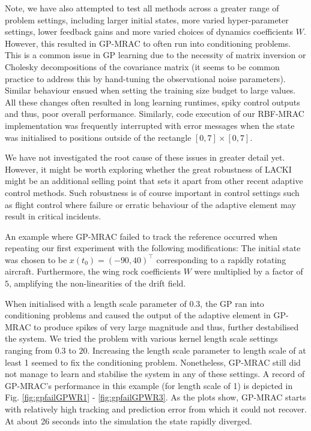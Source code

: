\documentclass{article} %
\theoremstyle{definition}
\theoremstyle{remark}
\begin{document}
Note, we have also attempted to test all methods across a greater range of problem settings, including larger initial states, more varied hyper-parameter settings, lower feedback gains and more varied choices of dynamics coefficients $W$. However, this resulted in GP-MRAC to often run into conditioning problems. This is a common issue in GP learning due to the necessity of matrix inversion or Cholesky decompositions of the covariance matrix (it seems to be common practice to address this by hand-tuning the observational noise parameters). Similar behaviour ensued when setting the training size budget to large values. All these changes often resulted in long learning runtimes, spiky control outputs and thus, poor overall performance. Similarly, code execution of our RBF-MRAC implementation was frequently interrupted with error messages when the state was initialised to positions outside of the rectangle $[0,7] \times [0,7]$.

We have not investigated the root cause of these issues in greater detail yet. However, it might be worth exploring whether the great robustness of LACKI might be an additional selling point that sets it apart from other recent adaptive control methods. Such robustness is of course important in control settings such as flight control where failure or erratic behaviour of the adaptive element may result in critical incidents. 

An example where GP-MRAC failed to track the reference occurred when repeating our first experiment  with the following modifications: The initial state was chosen to be $x(t_0) = (-90,40)^\top$ corresponding to a rapidly rotating aircraft. Furthermore, the wing rock coefficients $W$ were multiplied by a factor of $5$, amplifying the non-linearities of the drift field. 

When initialised with a length scale parameter of 0.3, the GP ran into conditioning problems and caused the output of the adaptive element in GP-MRAC to produce spikes of very large magnitude and thus, further destabilised the system. We tried the problem with various kernel length scale settings ranging from $0.3$ to $20$. Increasing the length scale parameter to length scale of at least 1 seemed to fix the conditioning problem. Nonetheless, GP-MRAC still did not manage to learn and stabilise the system in any of these settings. A record of GP-MRAC's performance in this example (for length scale of 1) is depicted in Fig.  \ref{fig:gpfailGPWR1} -  \ref{fig:gpfailGPWR3}. As the plots show, GP-MRAC starts with relatively high tracking and prediction error from which it could not recover. At about 26 seconds into the simulation the state rapidly diverged.
\end{document}

